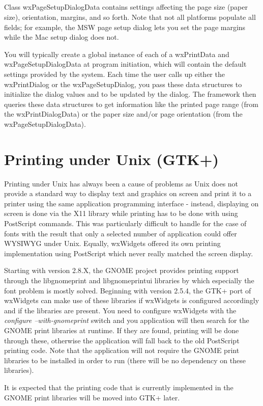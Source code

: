 \subsection{}

Class wxPageSetupDialogData contains settings affecting the page size (paper
size), orientation, margins, and so forth. Note that not all platforms populate
all fields; for example, the MSW page setup dialog lets you set the page margins
while the Mac setup dialog does not.

You will typically create a global instance of each of a wxPrintData and
wxPageSetupDialogData at program initiation, which will contain the default
settings provided by the system. Each time the user calls up either the
wxPrintDialog or the wxPageSetupDialog, you pass these data structures to
initialize the dialog values and to be updated by the dialog. The framework then
queries these data structures to get information like the printed page range
(from the wxPrintDialogData) or the paper size and/or page orientation (from the
wxPageSetupDialogData).



\section{Printing under Unix (GTK+)}\label{unixprinting}

Printing under Unix has always been a cause of problems as Unix
does not provide a standard way to display text and graphics
on screen and print it to a printer using the same application
programming interface - instead, displaying on screen is done
via the X11 library while printing has to be done with using
PostScript commands. This was particularly difficult to handle
for the case of fonts with the result that only a selected
number of application could offer WYSIWYG under Unix. Equally,
wxWidgets offered its own printing implementation using PostScript
which never really matched the screen display.

Starting with version 2.8.X, the GNOME project provides printing
support through the libgnomeprint and libgnomeprintui libraries
by which especially the font problem is mostly solved. Beginning
with version 2.5.4, the GTK+ port of wxWidgets can make use of
these libraries if wxWidgets is configured accordingly and if the
libraries are present. You need to configure wxWidgets with the
{\it configure --with-gnomeprint} switch and you application will
then search for the GNOME print libraries at runtime. If they
are found, printing will be done through these, otherwise the
application will fall back to the old PostScript printing code.
Note that the application will not require the GNOME print libraries
to be installed in order to run (there will be no dependency on
these libraries).

It is expected that the printing code that is currently implemented
in the GNOME print libraries will be moved into GTK+ later.

